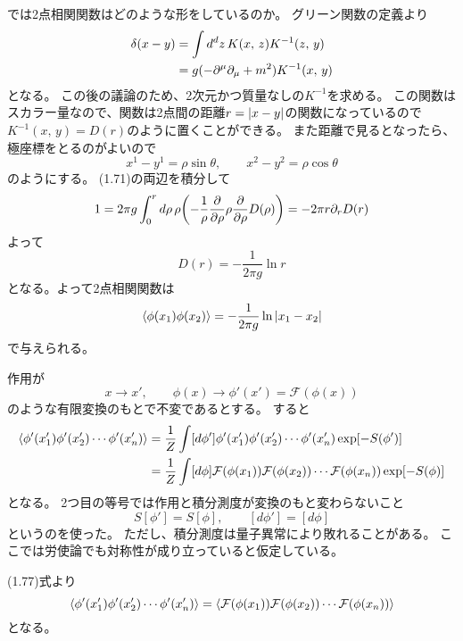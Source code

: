 \documentclass[../../master.tex]{subfiles}
\begin{document}
では2点相関関数はどのような形をしているのか。
グリーン関数の定義より
\setcounter{equation}{70}
\begin{align}
    \delta(x-y)
    &= \int d^dz\,K(x,\,z)K^{-1}(z,\,y)\notag\\
    &= g(-\partial^\mu\partial_\mu+m^2)K^{-1}(x,\,y)
\end{align}
となる。
この後の議論のため、2次元かつ質量なしの\(K^{-1}\)を求める。
この関数はスカラー量なので、関数は2点間の距離\(r=\abs{x-y}\)の関数になっているので
\(K^{-1}(x,\,y)=D(r)\)のように置くことができる。
また距離で見るとなったら、極座標をとるのがよいので
\begin{equation}
    x^1-y^1=\rho\sin\theta,\qquad x^2-y^2=\rho\cos\theta
\end{equation}
のようにする。
(1.71)の両辺を積分して
\begin{equation}
    1 = 2\pi g \int_0^r d\rho\,\rho\qty(-\frac{1}{\rho}\pdv{\rho}\rho\pdv{\rho}D(\rho)) = -2\pi r\partial_r D(r)
\end{equation}
よって
\begin{equation}
    D(r) = -\frac{1}{2\pi g}\ln r
\end{equation}
となる。よって2点相関関数は
\begin{equation}
    \ev{\phi(x_1)\phi(x_2)}=-\frac{1}{2\pi g}\ln\abs{x_1-x_2}
\end{equation}
で与えられる。

作用が
\begin{equation}
    x\rightarrow x',\qquad \phi(x)\rightarrow\phi'(x')=\mathcal{F}(\phi(x))
\end{equation}
のような有限変換のもとで不変であるとする。
すると
\begin{align}
    \ev{\phi'(x'_1)\phi'(x'_2)\cdots\phi'(x'_n)}
    &= \frac{1}{Z}\int[d\phi']\phi'(x'_1)\phi'(x'_2)\cdots\phi'(x'_n)\exp[-S(\phi')]\notag\\
    &= \frac{1}{Z}\int[d\phi]\mathcal{F}(\phi(x_1))\mathcal{F}(\phi(x_2))\cdots\mathcal{F}(\phi(x_n))\exp[-S(\phi)]\notag\\
\end{align}
となる。
2つ目の等号では作用と積分測度が変換のもと変わらないこと
\begin{equation}
    S[\phi'] = S[\phi], \qquad [d\phi']=[d\phi]
\end{equation}
というのを使った。
ただし、積分測度は量子異常により敗れることがある。
ここでは労使論でも対称性が成り立っていると仮定している。

(1.77)式より
\begin{equation}
    \ev{\phi'(x'_1)\phi'(x'_2)\cdots\phi'(x'_n)}
    = \ev{\mathcal{F}(\phi(x_1))\mathcal{F}(\phi(x_2))\cdots\mathcal{F}(\phi(x_n))}
\end{equation}
となる。
\end{document}
